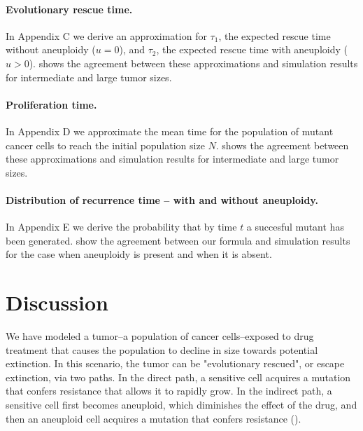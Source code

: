 \documentclass[12pt]{extarticle}
\begin{document}
\paragraph{Evolutionary rescue time.}
In Appendix C we derive an approximation for $\tau_1$, the expected rescue time without aneuploidy ($u=0$), and $\tau_2$, the expected rescue time with aneuploidy ($u>0$).  shows the agreement between these approximations and simulation results for intermediate and large tumor sizes.

\paragraph{Proliferation time.}

In Appendix D we approximate the mean time for the population of mutant cancer cells to reach the initial population size $N$.  shows the agreement between these approximations and simulation results for intermediate and large tumor sizes.

\paragraph{Distribution of recurrence time -- with and without aneuploidy.}

In Appendix E we derive the probability that by time $t$ a succesful mutant has been generated.  show the agreement between our formula and simulation results for the case when aneuploidy is present and when it is absent. 


\section*{Discussion}

We have modeled a tumor--a population of cancer cells--exposed to drug treatment that causes the population to decline in size towards potential extinction.
In this scenario, the tumor can be "evolutionary rescued", or escape extinction, via two paths. In the direct path, a sensitive cell acquires a mutation that confers resistance that allows it to rapidly grow. In the indirect path, a sensitive cell first becomes aneuploid, which diminishes the effect of the drug, and then an aneuploid cell acquires a mutation that confers resistance ().
\end{document}
